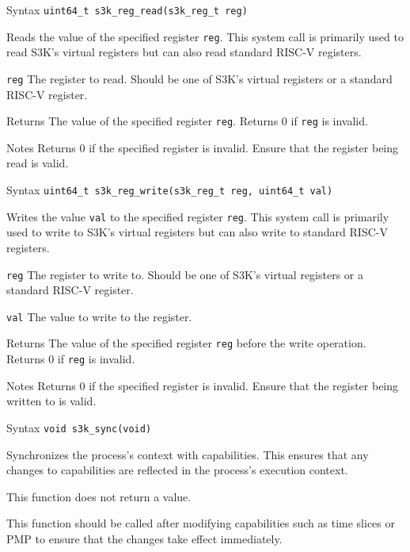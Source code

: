 \documentclass[a4paper,11pt]{article}
\newenvironment{syscalldoc}[1]{
  \begin{tcolorbox}[breakable,title=\subsection{\texttt{#1()}}]
  \begin{description}[leftmargin=!,style=nextline,noitemsep]
}{
  \end{description}
  \end{tcolorbox}
}
\begin{document}
\begin{syscalldoc}{s3k\_reg\_read}
  \item[Syntax] \lstinline{uint64_t s3k_reg_read(s3k_reg_t reg)}
  \item[Description] Reads the value of the specified register \verb|reg|. This system call is primarily used to read S3K's virtual registers but can also read standard RISC-V registers.
  \item[Parameters]
    \begin{description}
      \item[]
      \item[\texttt{reg}] The register to read. Should be one of S3K's virtual registers or a standard RISC-V register.
    \end{description}
  \item[Returns] The value of the specified register \verb|reg|. Returns 0 if \verb|reg| is invalid.
  \item[Notes] Returns 0 if the specified register is invalid. Ensure that the register being read is valid.
\end{syscalldoc}

\begin{syscalldoc}{s3k\_reg\_write}
  \item[Syntax] \lstinline{uint64_t s3k_reg_write(s3k_reg_t reg, uint64_t val)}
  \item[Description] Writes the value \verb|val| to the specified register \verb|reg|. This system call is primarily used to write to S3K's virtual registers but can also write to standard RISC-V registers.
  \item[Parameters]
    \begin{description}
      \item[]
      \item[\texttt{reg}] The register to write to. Should be one of S3K's virtual registers or a standard RISC-V register.
      \item[\texttt{val}] The value to write to the register.
    \end{description}
  \item[Returns] The value of the specified register \verb|reg| before the write operation. Returns 0 if \verb|reg| is invalid.
  \item[Notes] Returns 0 if the specified register is invalid. Ensure that the register being written to is valid.
\end{syscalldoc}

\begin{syscalldoc}{s3k\_sync}
  \item[Syntax] \lstinline{void s3k_sync(void)}
  \item[Description] Synchronizes the process's context with capabilities. This ensures that any changes to capabilities are reflected in the process's execution context.
  \item[Returns] This function does not return a value.
  \item[Notes] This function should be called after modifying capabilities such as time slices or PMP to ensure that the changes take effect immediately.
\end{syscalldoc}
\end{document}
